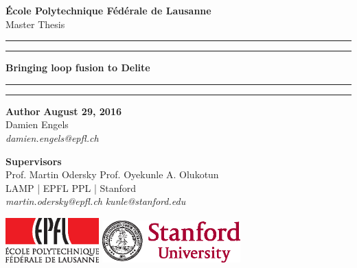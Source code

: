 
\begin{titlepage}
\begin{center}
\Large
\textbf{École Polytechnique Fédérale de Lausanne} \\
\vspace{1cm}
Master Thesis
\vspace{2cm}
\hrule
\vspace{0.1cm}
\hrule
\vspace{1cm}
\Huge
\textbf{Bringing loop fusion to Delite} \\
\vspace{1cm}
\hrule
\vspace{0.1cm}
\hrule
\end{center}
\vfill
\noindent \textbf{Author} \hfill \textbf{August 29, 2016} \\
Damien Engels \\
\textit{damien.engels@epfl.ch} \\
\vspace{0.5cm}

\noindent \textbf{Supervisors} \\
Prof. Martin Odersky            \hfill    Prof. Oyekunle A. Olukotun \\
LAMP | EPFL                     \hfill    PPL | Stanford \\
\textit{martin.odersky@epfl.ch} \hfill    \textit{kunle@stanford.edu} \\
\vspace{0.8cm}

\noindent
\includegraphics[width=0.27\textwidth]{images/epfl-logo.eps}
\hfill
\includegraphics[width=0.4\textwidth]{images/stanford-logo.eps}

\end{titlepage}

\newpage
\null
\newpage

